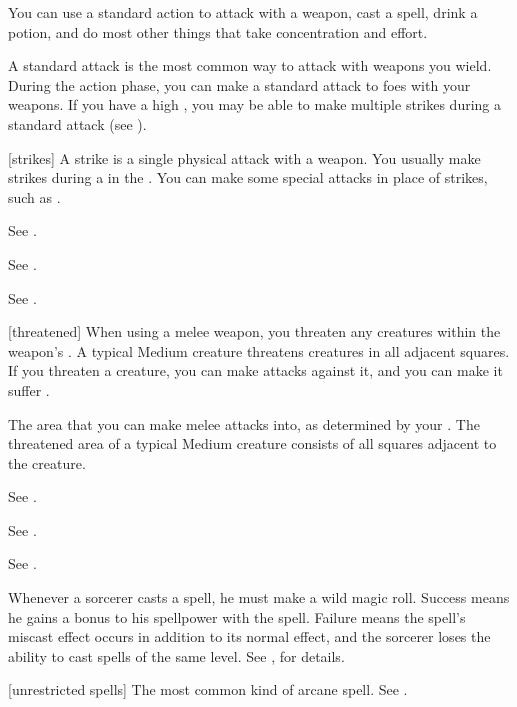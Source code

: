 You can use a standard action to attack with a weapon, cast a spell, drink a potion, and do most other things that take concentration and effort.

 A standard attack is the most common way to attack with weapons you wield.
During the action phase, you can make a standard attack to  foes with your weapons.
If you have a high , you may be able to make multiple strikes during a standard attack (see ).

[strikes] A strike is a single physical attack with a weapon.
You usually make strikes during a  in the .
You can make some special attacks in place of strikes, such as .

 See .

 See .

 See .

[threatened] When using a melee weapon, you threaten any creatures within the weapon's .
A typical Medium creature threatens creatures in all adjacent squares.
If you threaten a creature, you can make  attacks against it, and you can make it suffer .

 The area that you can make melee attacks into, as determined by your .
The threatened area of a typical Medium creature consists of all squares adjacent to the creature.

 See .

 See .

 See .

 Whenever a sorcerer casts a spell, he must make a wild magic roll.
Success means he gains a bonus to his spellpower with the spell.
Failure means the spell's miscast effect occurs in addition to its normal effect, and the sorcerer loses the ability to cast spells of the same level.
See , for details.

[unrestricted spells] The most common kind of arcane spell. See .
